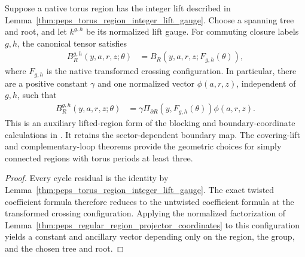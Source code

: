 \begin{lemma}%
    \label{thm:peps_torus_region_integer_lift_coordinates}
    \leanok
    Suppose a native torus region has the integer lift described in
    Lemma~\ref{thm:peps_torus_region_integer_lift_gauge}. Choose a spanning
    tree and root, and let $k^{g,h}$ be its normalized lift gauge. For
    commuting closure labels $g,h$, the canonical tensor satisfies
    \begin{align}
        B_R^{g,h}(y,a,r,z;\theta)
         & =B_R(y,a,r,z;F_{g,h}(\theta)),
    \end{align}
    where $F_{g,h}$ is the native transformed crossing configuration.
    In particular, there are a positive constant $\gamma$ and one
    normalized vector $\phi(a,r,z)$, independent of $g,h$, such that
    \begin{align}
        B_R^{g,h}(y,a,r,z;\theta)
         & =\gamma\Pi_{\partial R}(y,F_{g,h}(\theta))\phi(a,r,z).
    \end{align}
    This is an auxiliary lifted-region form of the blocking and
    boundary-coordinate calculations in \cite[\S6.2--6.3]{Schuch2010PEPS}.
    It retains the sector-dependent boundary map. The covering-lift
    and complementary-loop theorems provide the geometric choices for
    simply connected regions with torus periods at least three.
\end{lemma}

\begin{proof}\leanok
    Every cycle residual is the identity by
    Lemma~\ref{thm:peps_torus_region_integer_lift_gauge}. The exact twisted
    coefficient formula therefore reduces to the untwisted coefficient
    formula at the transformed crossing configuration. Applying the
    normalized factorization of
    Lemma~\ref{thm:peps_regular_region_projector_coordinates} to this
    configuration yields a constant and ancillary vector depending only on
    the region, the group, and the chosen tree and root.
\end{proof}
